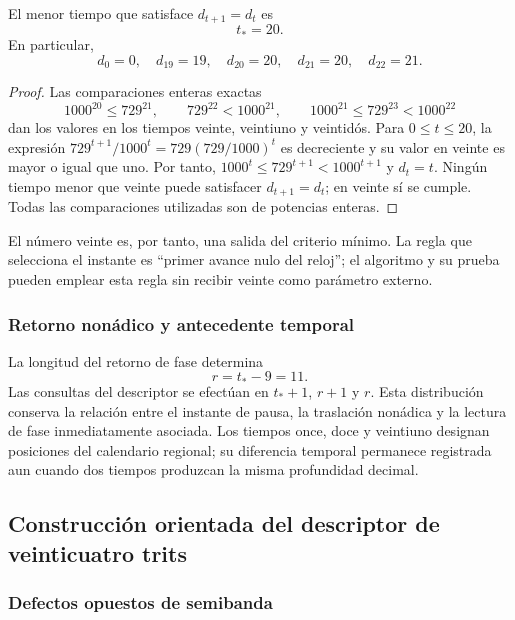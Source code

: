 \begin{proposition}
El menor tiempo que satisface $d_{t+1}=d_t$ es
\[
 t_*=20.
\]
En particular,
\[
 d_0=0,\quad d_{19}=19,\quad d_{20}=20,
 \quad d_{21}=20,\quad d_{22}=21.
\]
\end{proposition}
\begin{proof}
Las comparaciones enteras exactas
\[
 1000^{20}\leq729^{21},\qquad
 729^{22}<1000^{21},\qquad
 1000^{21}\leq729^{23}<1000^{22}
\]
dan los valores en los tiempos veinte, veintiuno y veintidós. Para
$0\leq t\leq20$, la expresión
$729^{t+1}/1000^t=729(729/1000)^t$ es decreciente y su valor en veinte
es mayor o igual que uno. Por tanto,
$1000^t\leq729^{t+1}<1000^{t+1}$ y $d_t=t$. Ningún tiempo menor que
veinte puede satisfacer $d_{t+1}=d_t$; en veinte sí se cumple.
Todas las comparaciones utilizadas son de potencias enteras.
\end{proof}

El número veinte es, por tanto, una salida del criterio mínimo. La regla
que selecciona el instante es ``primer avance nulo del reloj''; el
algoritmo y su prueba pueden emplear esta regla sin recibir veinte como
parámetro externo.

\subsubsection{Retorno nonádico y antecedente temporal}

La longitud del retorno de fase determina
\begin{equation}
 r=t_*-9=11.
 \label{eq:kdes-retorno}
\end{equation}
Las consultas del descriptor se efectúan en $t_*+1$, $r+1$ y $r$.
Esta distribución conserva la relación entre el instante de pausa, la
traslación nonádica y la lectura de fase inmediatamente asociada. Los
tiempos once, doce y veintiuno designan posiciones del calendario
regional; su diferencia temporal permanece registrada aun cuando dos
tiempos produzcan la misma profundidad decimal.

\subsection{Construcción orientada del descriptor de veinticuatro trits}

\subsubsection{Defectos opuestos de semibanda}

